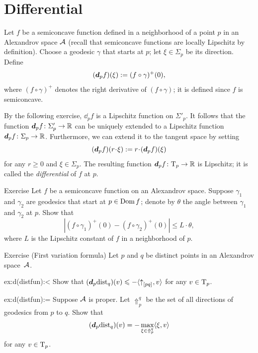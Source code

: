 \section{Differential}\label{sec:differential}

Let $f$ be a semiconcave function defined in a neighborhood of a point $p$ in an Alexandrov space $\mathcal{A}$ (recall that semiconcave functions are locally Lipschitz by definition).
Choose a geodesic $\gamma$ that starts at $p$;
let $\xi\in\Sigma_p$ be its direction.
Define 
\[(\bm{d}_pf)(\xi)\mathrel{:=}(f\circ\gamma)^+(0),\]
where $(f\circ\gamma)^+$ denotes the right derivative of $(f\circ\gamma)$;
it is defined since $f$ is semiconcave.

By the following exercise, $\dd_pf$ is a Lipschitz function on $\Sigma'_p$.
It follows that the function $\bm{d}_pf\colon\Sigma_p'\to\mathbb{R}$ can be uniquely extended to a Lipschitz function $\bm{d}_pf\colon\Sigma_p\to\mathbb{R}$.
Furthermore, we can extend it to the tangent space by setting
\[(\dd_pf)(r\cdot \xi)
\df
r\cdot (\dd_pf)(\xi)\]
for any $r\ge 0$ and $\xi\in\Sigma_p$.
The resulting function $\bm{d}_pf\colon\mathrm{T}_p\to\mathbb{R}$ is Lipschitz;
it is called the \emph{differential} of $f$ at $p$.

\begin{thm}{Exercise}\label{ex:df(xi)}
Let $f$ be a semiconcave function on an Alexandrov space.
Suppose $\gamma_1$ and $\gamma_2$ are geodesics that start at $p\z\in \Dom f$;
denote by $\theta$ the angle between $\gamma_1$ and $\gamma_2$ at $p$.
Show that 
\[|(f\circ\gamma_1)^+(0)-(f\circ\gamma_2)^+(0)|\le L\cdot \theta,\]
where $L$ is the Lipschitz constant of $f$ in a neighborhood of $p$.
\end{thm}

\begin{thm}[!]{Exercise (First variation formula)} \label{ex:d(distfun)}
Let $p$ and $q$ be distinct points in an Alexandrov space~$\mathcal{A}$.

\begin{subthm}{ex:d(distfun):<}
Show that
$(\bm{d}_p\mathrm{dist}_q)(v)\leqslant -\langle{\uparrow}_{[{p}{q}]_{{}}},v\rangle$
for any $v\in\mathrm{T}_p$.
\end{subthm}

\begin{subthm}{ex:d(distfun):=}
Suppose $\mathcal{A}$ is proper.
Let $\Uparrow_p^q$ be the set of all directions of geodesics from $p$ to $q$.
Show that
\[(\bm{d}_p\mathrm{dist}_q)(v)=-\max_{\xi\in\Uparrow_p^q}\langle\xi,v\rangle\]
for any $v\in\mathrm{T}_p$.
\end{subthm}

\end{thm}

